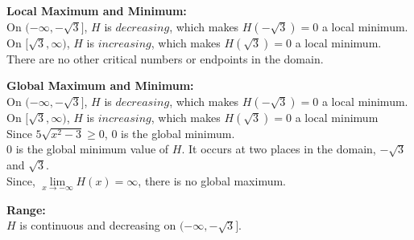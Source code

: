 \documentclass{ximera}
\begin{document}
\textbf{\textcolor{blue!55!black}{Local Maximum and Minimum:}} \\





On $(-\infty, -\sqrt{3} ]$, $H$ is $decreasing$, which makes $H(-\sqrt{3}) = 0$ a local minimum.  \\


On $[ \sqrt{3}, \infty)$, $H$ is $increasing$, which makes $H(\sqrt{3}) = 0$ a local minimum.  \\



There are no other critical numbers or endpoints in the domain.









\textbf{\textcolor{blue!55!black}{Global Maximum and Minimum:}} \\



On $(-\infty, -\sqrt{3} ]$, $H$ is $decreasing$, which makes $H(-\sqrt{3}) = 0$ a local minimum. \\


On $[ \sqrt{3}, \infty)$, $H$ is $increasing$, which makes $H(\sqrt{3}) = 0$ a local minimum  \\




Since $5 \sqrt{x^2-3} \geq 0$, $0$ is the global minimum. \\



$0$ is the global minimum value of $H$. It occurs at two places in the domain, $-\sqrt{3}$ and $\sqrt{3}$. \\



Since, $\lim\limits_{x \to -\infty} H(x) = \infty$, there is no global maximum. 














\textbf{\textcolor{blue!55!black}{Range:}} \\



$H$ is continuous and decreasing on $( -\infty, -\sqrt{3} ]$. \\
\end{document}

